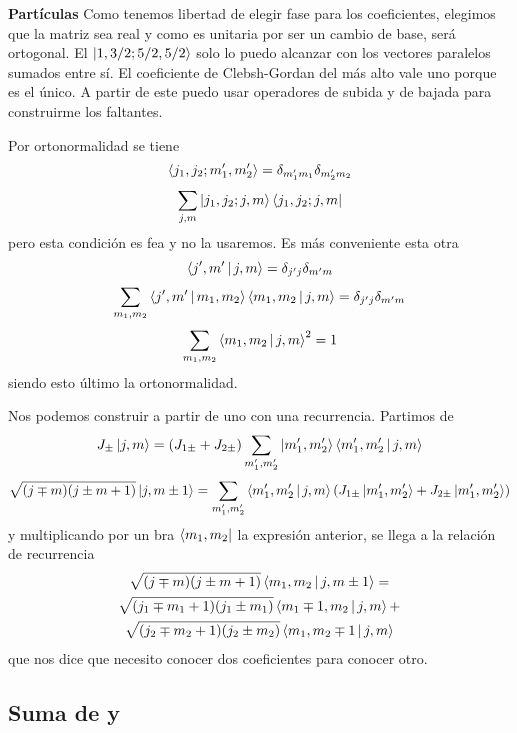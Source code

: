 \documentclass[10pt,oneside]{CBFT_book}
\begin{document}
\begin{ejemplo}{\bf Partículas}
Como tenemos libertad de elegir fase para los coeficientes, elegimos que la matriz sea real
y como es unitaria por ser un cambio de base, será ortogonal.
El $\Ket{1,3/2;5/2,5/2}$ solo lo puedo alcanzar con los vectores paralelos sumados entre sí.
El coeficiente de Clebsh-Gordan del más alto vale uno porque es el único. A partir de este
puedo usar operadores de subida y de bajada para construirme los faltantes.\

Por ortonormalidad se tiene
\[
	\Braket{ j_1, j_2 ; m_1', m_2' } = \delta_{m_1' m_1}  \delta_{m_2' m_2}
\]
\[
	\sum_{j,m} \Ket{ j_1, j_2 ; j, m }\Bra{ j_1, j_2 ; j, m }
\]
pero esta condición es fea y no la usaremos.
Es más conveniente esta otra
\[
	\Braket{j',m'|j,m} = \delta_{j'j}\delta_{m'm}
\]
\[
	\sum_{m_1,m_2} \Braket{j',m'|m_1,m_2}\Braket{m_1,m_2|j,m} = \delta_{j'j}\delta_{m'm}
\]
\[
	\sum_{m_1,m_2} \Braket{m_1,m_2|j,m}^2 = 1
\]
siendo esto último la ortonormalidad.

Nos podemos construir a partir de uno con una recurrencia. Partimos de
\[
	J_\pm \ket{j,m} = ( J_{1\pm} + J_{2\pm} ) \sum_{m_1',m_2'} \Ket{m_1',m_2'}\Braket{m_1',m_2'|j,m}
\]
\[
	\sqrt{(j\mp m)(j\pm m + 1)} \ket{j,m\pm 1} = \sum_{m_1',m_2'}\Braket{m_1',m_2'|j,m}  
	( J_{1\pm}\Ket{m_1',m_2'} + J_{2\pm}\Ket{m_1',m_2'} ) 
\]
y multiplicando por un bra $\Bra{m_1,m_2}$ la expresión anterior, se llega a la relación de recurrencia
\begin{multline*}
	\sqrt{(j\mp m)(j\pm m + 1)} \Braket{m_1,m_2|j,m\pm 1} = \\
	\sqrt{(j_1 \mp m_1 + 1 )(j_1 \pm m_1)} \Braket{m_1 \mp 1 ,m_2|j,m}  + \\
	\sqrt{(j_2 \mp m_2 + 1 )(j_2 \pm m_2)}  \Braket{m_1,m_2 \mp 1| j,m } 
\end{multline*}
que nos dice que necesito conocer dos coeficientes para conocer otro.
 
\end{ejemplo}
% 





\subsection{Suma de  y }
\end{document}
